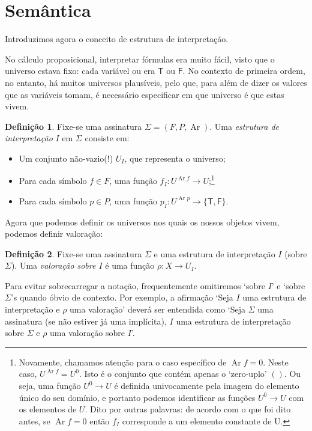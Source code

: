 \documentclass{report}
\theoremstyle{definition}
\newtheorem{definicao}{Definição}
\theoremstyle{remark}
\newcommand{\lt}{\mathsf{T}}
\newcommand{\lf}{\mathsf{F}}
\DeclareMathOperator{\ar}{Ar}
\begin{document}
	\section{Semântica}
	
	Introduzimos agora o conceito de estrutura de interpretação.
	
	No cálculo proposicional, interpretar fórmulas era muito fácil, visto que o universo estava fixo: cada variável ou era $\lt$ ou $\lf$. No contexto de primeira ordem, no entanto, há muitos universos plausíveis, pelo que, para além de dizer os valores que as variáveis tomam, é necessário especificar em que universo é que estas vivem.
	
	\begin{definicao}	
	Fixe-se uma assinatura $\Sigma = (F, P, \ar)$. Uma \emph{estrutura de interpretação} $I$ em $\Sigma$ consiste em:
	
	\begin{itemize}
	\item Um conjunto não-vazio(!) $U_I$, que representa o universo;
	
	\item Para cada símbolo $f \in F$, uma função $f_I : U^{\ar f} \to U$;\footnote{Novamente, chamamos atenção para o caso específico de $\ar f = 0$. Neste caso, $U^{\ar f} = U^0$. Isto é o conjunto que contém apenas o `zero-uplo' $()$. Ou seja, uma função $U^0 \to U$ é definida univocamente pela imagem do elemento único do seu domínio, e portanto podemos identificar as funções $U^0 \to U$ com os elementos de $U$. Dito por outras palavras: de acordo com o que foi dito antes, se $\ar f = 0$ então $f_I$ corresponde a um elemento constante de U.}
	
	\item Para cada símbolo $p \in P$, uma função $p_I : U^{\ar p} \to \{\lt, \lf\}$.
	\end{itemize}
	\end{definicao}
	
	Agora que podemos definir os universos nos quais os nossos objetos vivem, podemos definir valoração:
	
	\begin{definicao}
	Fixe-se uma assinatura $\Sigma$ e uma estrutura de interpretação $I$ (sobre $\Sigma$). Uma \emph{valoração sobre $I$} é uma função $\rho : X \to U_I$.
	\end{definicao}
	
	Para evitar sobrecarregar a notação, frequentemente omitiremos `sobre $I$' e `sobre $\Sigma$'s quando óbvio de contexto. Por exemplo, a afirmação `Seja $I$ uma estrutura de interpretação e $\rho$ uma valoração' deverá ser entendida como `Seja $\Sigma$ uma assinatura (se não estiver já uma implícita), $I$ uma estrutura de interpretação sobre $\Sigma$ e $\rho$ uma valoração sobre $I$'.
	
\end{document}
